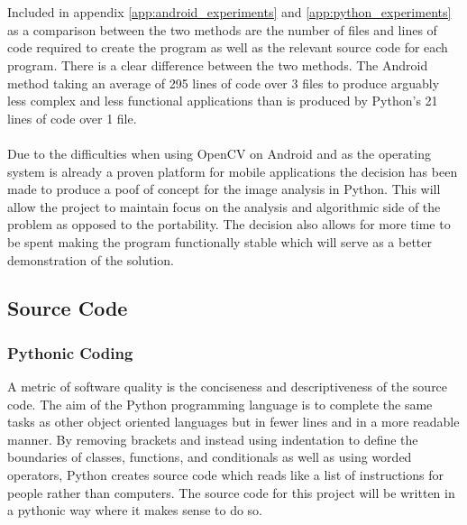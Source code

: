 		\\\\
		Included in appendix \ref{app:android_experiments} and \ref{app:python_experiments} as a comparison between the two methods are the number of files and lines of code required to create the program as well as the relevant source code for each program. There is a clear difference between the two methods. The Android method taking an average of 295 lines of code over 3 files to produce arguably less complex and less functional applications than is produced by Python's 21 lines of code over 1 file.
		\\\\
		Due to the difficulties when using OpenCV on Android and as the operating system is already a proven platform for mobile applications the decision has been made to produce a poof of concept for the image analysis in Python. This will allow the project to maintain focus on the analysis and algorithmic side of the problem as opposed to the portability. The decision also allows for more time to be spent making the program functionally stable which will serve as a better demonstration of the solution.
\subsection{Source Code}
	\subsubsection{Pythonic Coding}
		A metric of software quality is the conciseness and descriptiveness of the source code. The aim of the Python programming language is to complete the same tasks as other object oriented languages but in fewer lines and in a more readable manner. By removing brackets and instead using indentation to define the boundaries of classes, functions, and conditionals as well as using worded operators, Python creates source code which reads like a list of instructions for people rather than computers. The source code for this project will be written in a pythonic way where it makes sense to do so.

